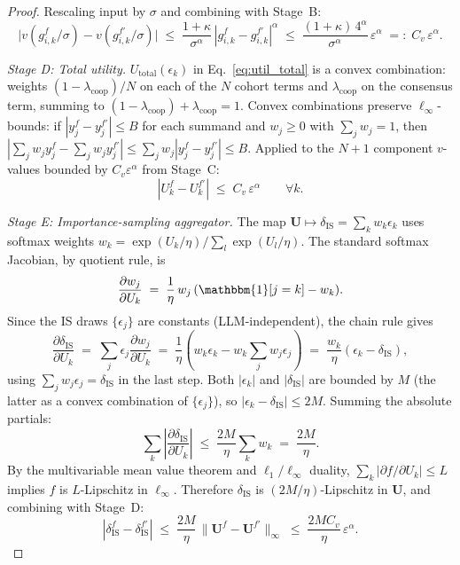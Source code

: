 \documentclass{article}
\begin{document}
\begin{proof}
Rescaling input by $\sigma$ and combining with Stage~B:
\begin{equation*}
\big|v(g_{i,k}^f/\sigma) - v(g_{i,k}^{f'}/\sigma)\big| 
\;\leq\; \frac{1+\kappa}{\sigma^\alpha}\,|g_{i,k}^f - g_{i,k}^{f'}|^\alpha 
\;\leq\; \frac{(1+\kappa)\,4^\alpha}{\sigma^\alpha}\,\varepsilon^\alpha 
\;=:\; C_v\,\varepsilon^\alpha.
\end{equation*}

\textit{Stage D: Total utility.} $U_{\text{total}}(\epsilon_k)$ in Eq.~\ref{eq:util_total} is a convex combination: weights $(1-\lambda_{\text{coop}})/N$ on each of the $N$ cohort terms and $\lambda_{\text{coop}}$ on the consensus term, summing to $(1-\lambda_{\text{coop}}) + \lambda_{\text{coop}} = 1$. Convex combinations preserve $\ell_\infty$-bounds: if $|y_j^f - y_j^{f'}| \leq B$ for each summand and $w_j \geq 0$ with $\sum_j w_j = 1$, then $|\sum_j w_j y_j^f - \sum_j w_j y_j^{f'}| \leq \sum_j w_j |y_j^f - y_j^{f'}| \leq B$. Applied to the $N+1$ component $v$-values bounded by $C_v\varepsilon^\alpha$ from Stage~C:
\begin{equation*}
|U_k^f - U_k^{f'}| \;\leq\; C_v\,\varepsilon^\alpha \qquad \forall k.
\end{equation*}

\textit{Stage E: Importance-sampling aggregator.} The map $\mathbf{U} \mapsto \delta_{\text{IS}} = \sum_k w_k \epsilon_k$ uses softmax weights $w_k = \exp(U_k/\eta)/\sum_l \exp(U_l/\eta)$. The standard softmax Jacobian, by quotient rule, is
\begin{equation*}
\frac{\partial w_j}{\partial U_k} \;=\; \frac{1}{\eta}\,w_j\,(\mathbbm{1}[j=k] - w_k).
\end{equation*}
Since the IS draws $\{\epsilon_j\}$ are constants (LLM-independent), the chain rule gives
\begin{equation*}
\frac{\partial \delta_{\text{IS}}}{\partial U_k} \;=\; \sum_j \epsilon_j \frac{\partial w_j}{\partial U_k} \;=\; \frac{1}{\eta}\!\left(w_k\epsilon_k - w_k\sum_j w_j \epsilon_j\right) \;=\; \frac{w_k}{\eta}(\epsilon_k - \delta_{\text{IS}}),
\end{equation*}
using $\sum_j w_j \epsilon_j = \delta_{\text{IS}}$ in the last step. Both $|\epsilon_k|$ and $|\delta_{\text{IS}}|$ are bounded by $M$ (the latter as a convex combination of $\{\epsilon_j\}$), so $|\epsilon_k - \delta_{\text{IS}}| \leq 2M$. Summing the absolute partials:
\begin{equation*}
\sum_k \left|\frac{\partial \delta_{\text{IS}}}{\partial U_k}\right| \;\leq\; \frac{2M}{\eta}\sum_k w_k \;=\; \frac{2M}{\eta}.
\end{equation*}
By the multivariable mean value theorem and $\ell_1/\ell_\infty$ duality, $\sum_k |\partial f/\partial U_k| \leq L$ implies $f$ is $L$-Lipschitz in $\ell_\infty$. Therefore $\delta_{\text{IS}}$ is $(2M/\eta)$-Lipschitz in $\mathbf{U}$, and combining with Stage~D:
\begin{equation*}
|\delta_{\text{IS}}^f - \delta_{\text{IS}}^{f'}| \;\leq\; \frac{2M}{\eta}\,\|\mathbf{U}^f - \mathbf{U}^{f'}\|_\infty \;\leq\; \frac{2M C_v}{\eta}\,\varepsilon^\alpha.
\end{equation*}


\end{proof}
\end{document}
